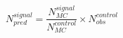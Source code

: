 \begin{equation}
\label{control}
N_{pred}^{signal}=\frac{N_{MC}^{signal}}{N_{MC}^{control}}\times N^{control}_{obs}
\end{equation} 

